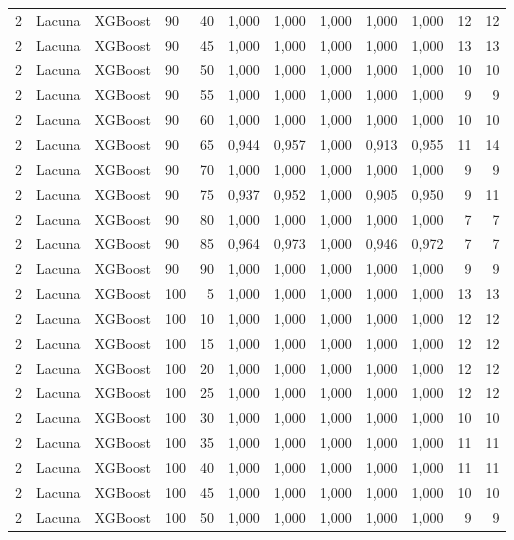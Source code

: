 \begin{longtable}{ccclrrrrrrrr}
2 & Lacuna & XGBoost & 90 & 40 & 1,000 & 1,000 & 1,000 & 1,000 & 1,000 & 12 & 12 \\
2 & Lacuna & XGBoost & 90 & 45 & 1,000 & 1,000 & 1,000 & 1,000 & 1,000 & 13 & 13 \\
2 & Lacuna & XGBoost & 90 & 50 & 1,000 & 1,000 & 1,000 & 1,000 & 1,000 & 10 & 10 \\
2 & Lacuna & XGBoost & 90 & 55 & 1,000 & 1,000 & 1,000 & 1,000 & 1,000 & 9 & 9 \\
2 & Lacuna & XGBoost & 90 & 60 & 1,000 & 1,000 & 1,000 & 1,000 & 1,000 & 10 & 10 \\
2 & Lacuna & XGBoost & 90 & 65 & 0,944 & 0,957 & 1,000 & 0,913 & 0,955 & 11 & 14 \\
2 & Lacuna & XGBoost & 90 & 70 & 1,000 & 1,000 & 1,000 & 1,000 & 1,000 & 9 & 9 \\
2 & Lacuna & XGBoost & 90 & 75 & 0,937 & 0,952 & 1,000 & 0,905 & 0,950 & 9 & 11 \\
2 & Lacuna & XGBoost & 90 & 80 & 1,000 & 1,000 & 1,000 & 1,000 & 1,000 & 7 & 7 \\
2 & Lacuna & XGBoost & 90 & 85 & 0,964 & 0,973 & 1,000 & 0,946 & 0,972 & 7 & 7 \\
2 & Lacuna & XGBoost & 90 & 90 & 1,000 & 1,000 & 1,000 & 1,000 & 1,000 & 9 & 9 \\
2 & Lacuna & XGBoost & 100 & 5 & 1,000 & 1,000 & 1,000 & 1,000 & 1,000 & 13 & 13 \\
2 & Lacuna & XGBoost & 100 & 10 & 1,000 & 1,000 & 1,000 & 1,000 & 1,000 & 12 & 12 \\
2 & Lacuna & XGBoost & 100 & 15 & 1,000 & 1,000 & 1,000 & 1,000 & 1,000 & 12 & 12 \\
2 & Lacuna & XGBoost & 100 & 20 & 1,000 & 1,000 & 1,000 & 1,000 & 1,000 & 12 & 12 \\
2 & Lacuna & XGBoost & 100 & 25 & 1,000 & 1,000 & 1,000 & 1,000 & 1,000 & 12 & 12 \\
2 & Lacuna & XGBoost & 100 & 30 & 1,000 & 1,000 & 1,000 & 1,000 & 1,000 & 10 & 10 \\
2 & Lacuna & XGBoost & 100 & 35 & 1,000 & 1,000 & 1,000 & 1,000 & 1,000 & 11 & 11 \\
2 & Lacuna & XGBoost & 100 & 40 & 1,000 & 1,000 & 1,000 & 1,000 & 1,000 & 11 & 11 \\
2 & Lacuna & XGBoost & 100 & 45 & 1,000 & 1,000 & 1,000 & 1,000 & 1,000 & 10 & 10 \\
2 & Lacuna & XGBoost & 100 & 50 & 1,000 & 1,000 & 1,000 & 1,000 & 1,000 & 9 & 9 \\

\end{longtable}
